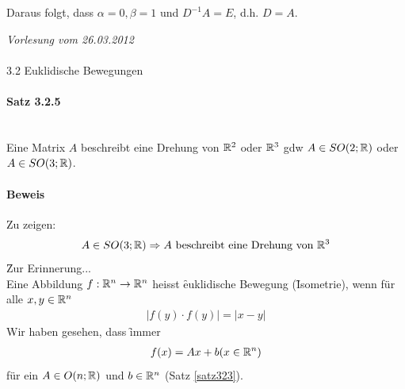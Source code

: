 Daraus folgt, dass $\alpha = 0, \beta = 1$ und $D^{-1} A = E$, d.h. $D=A$.

\newpage
\noindent \textit{Vorlesung vom 26.03.2012} \\\\
\Large{3.2 Euklidische Bewegungen} \\
\normalsize
\paragraph{Satz 3.2.5} {\ \\}
Eine Matrix $A$ beschreibt eine Drehung von $\mathbb{R}^2$ oder $\mathbb{R}^3$ gdw $A \in SO(2; \mathbb{R})$ oder $A \in SO(3; \mathbb{R})$.

\paragraph{Beweis} Zu zeigen:
\begin{align}
 A \in SO(3; \mathbb{R}) \Rightarrow \text{$A$ beschreibt eine Drehung von $\mathbb{R}^3$}
\end{align}
\f{Zur Erinnerung...}\\
Eine Abbildung $f: \mathbb{R}^n \rightarrow \mathbb{R}^n$ heisst \f{euklidische Bewegung} (\f{Isometrie}), wenn für alle $x, y \in \mathbb{R}^n$
\begin{align}
|f(y) \cdot f(y)| = |x-y|
\end{align}
Wir haben gesehen, dass \f{immer}
\begin{align}
f(x) = Ax + b (x \in \mathbb{R}^n)
\end{align}
für ein $A \in O(n; \mathbb{R})$ und $b \in \mathbb{R}^n$ (Satz \ref{satz323}).

